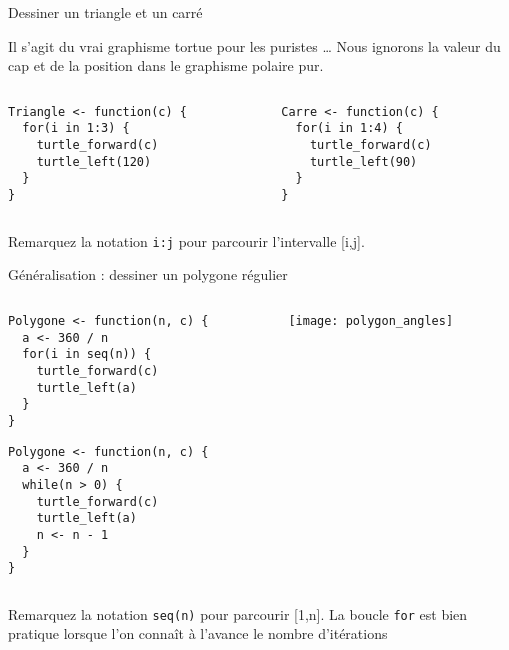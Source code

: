 \documentclass[10pt]{beamer}
\begin{document}
\begin{frame}[fragile]{Dessiner un triangle et un carré}

Il s'agit du vrai graphisme tortue pour les puristes \dots
Nous ignorons la valeur du cap et de la position dans le graphisme polaire pur.

\begin{columns}[t]
\begin{column}{0.48\textwidth}
  \begin{lstlisting}[style=edblock]
Triangle <- function(c) {
  for(i in 1:3) {
    turtle_forward(c)
    turtle_left(120)
  }
}
\end{lstlisting}



\end{column}
\begin{column}{0.48\textwidth}
  \begin{lstlisting}[style=edblock]
Carre <- function(c) {
  for(i in 1:4) {
    turtle_forward(c)
    turtle_left(90)
  }
}
\end{lstlisting}

\end{column}
\end{columns}


Remarquez la notation \lstinline!i:j! pour parcourir l'intervalle [i,j].

\end{frame}

\begin{frame}[fragile]{Généralisation : dessiner un polygone régulier}


\begin{columns}[c]
\begin{column}{0.48\textwidth}
\begin{lstlisting}[style=editor]
Polygone <- function(n, c) {
  a <- 360 / n
  for(i in seq(n)) {
    turtle_forward(c)
    turtle_left(a)
  }
}
\end{lstlisting}

\begin{lstlisting}[style=editor]
Polygone <- function(n, c) {
  a <- 360 / n
  while(n > 0) {
    turtle_forward(c)
    turtle_left(a)
    n <- n - 1
  }
}
\end{lstlisting}
\end{column}
\begin{column}{0.48\textwidth}
\texttt{[image: polygon\_angles]}
\end{column}
\end{columns}

Remarquez la notation \lstinline!seq(n)! pour parcourir [1,n].
La boucle \texttt{for} est bien pratique lorsque l'on connaît à l'avance le nombre d'itérations
\end{frame}
\end{document}
